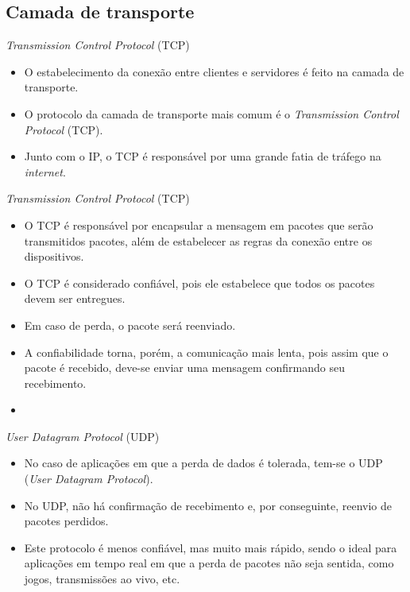 \documentclass[11pt]{beamer}
\begin{document}
    \subsection{Camada de transporte}

    \begin{frame}{\textit{Transmission Control Protocol} (TCP)}
      \begin{itemize}
        \item O estabelecimento da conexão entre clientes e servidores é feito na camada de transporte.
        \item O protocolo da camada de transporte mais comum é o \textit{Transmission Control Protocol} (TCP).
        \item Junto com o IP, o TCP é responsável por uma grande fatia de tráfego na \textit{internet}.  
      \end{itemize}
    \end{frame}

    \begin{frame}{\textit{Transmission Control Protocol} (TCP)}
      \begin{itemize}
        \item O TCP é responsável por encapsular a mensagem em pacotes que serão transmitidos pacotes, além de estabelecer as regras da conexão entre os dispositivos.
        \item O TCP é considerado confiável, pois ele estabelece que todos os pacotes devem ser entregues.
        \item Em caso de perda, o pacote será reenviado.
        \item A confiabilidade torna, porém, a comunicação mais lenta, pois assim que o pacote é recebido, deve-se enviar uma mensagem confirmando seu recebimento.
        \item 
      \end{itemize}
    \end{frame}

    \begin{frame}{\textit{User Datagram Protocol} (UDP)}
      \begin{itemize}
        \item No caso de aplicações em que a perda de dados é tolerada, tem-se o UDP (\textit{User Datagram Protocol}).
        \item No UDP, não há confirmação de recebimento e, por conseguinte, reenvio de pacotes perdidos.
        \item Este protocolo é menos confiável, mas muito mais rápido, sendo o ideal para aplicações em tempo real em que a perda de pacotes não seja sentida, como jogos, transmissões ao vivo, etc.
      \end{itemize}
    \end{frame}
\end{document}

